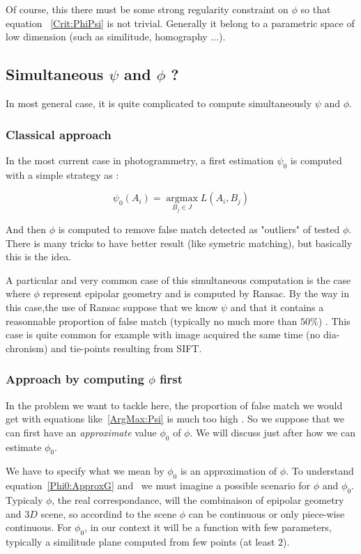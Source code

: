 Of course, this there must be some strong regularity constraint on $\phi$ so that
equation ~\ref{Crit:PhiPsi} is not trivial. Generally it belong to a parametric
space of low dimension (such as similitude, homography ...).


\subsection{Simultaneous $\psi$ and $\phi$ ?}

In most general case, it is quite complicated to compute simultaneously $\psi$
and $\phi$.

\subsubsection{Classical approach}
In the most current case in photogrammetry, a first estimation $\psi_0$ is computed with a simple
strategy as :

\begin{equation}
    \psi_0(A_i) =  \underset{B_j \in J}{\operatorname{argmax}}  L(A_i,B_j) \label{ArgMax:Psi}
\end{equation}

And then $\phi$
is computed to remove false match detected as "outliers" of tested $\phi$. 
There is many tricks to have better result (like symetric matching), but basically
this is the idea.

A particular and very common case of this simultaneous computation is the case
where $\phi$ represent epipolar geometry and is computed by Ransac. By the way in this
case,the  use of Ransac suppose that we know $\psi$ and that it contains a reasonnable
proportion of false match (typically no much more than $50\%$) . This case is quite common
for example with image acquired the same time (no dia-chronism) and tie-points resulting
from SIFT.

\subsubsection{Approach by computing $\phi$ first}

In the problem we want to tackle here, the proportion of false match we would get with
equations like~\ref{ArgMax:Psi} is much too high . So we suppose that we can first
have an \emph{approximate} value $\phi_0$ of $\phi$. We will discuss just after how we can
estimate $\phi_0$.

We have to specify what we mean by $\phi_0$ is an approximation of $\phi$.
To understand equation~\ref{Phi0:ApproxG}  and~\label{Phi0:Appro} we must
imagine a possible scenario for $\phi$ and $\phi_0$. Typicaly $\phi$, the real
correspondance, will the combinaison of epipolar geometry and $3D$ scene, so accordind
to the scene $\phi$ can be  continuous or only piece-wise continuous. For $\phi_0$,
in our context it will be a function with few parameters, typically a similitude
plane computed from few points (at least $2$). 

